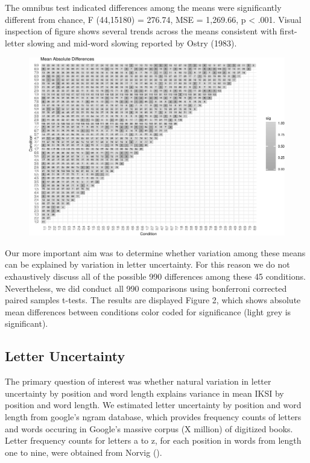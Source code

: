 \documentclass[floatsintext,man]{apa6}
\theoremstyle{definition}
\theoremstyle{definition}
\theoremstyle{definition}
\theoremstyle{remark}
\begin{document}
The omnibus test indicated differences among the means were
significantly different from chance, F (44,15180) = 276.74, MSE =
1,269.66, p \textless{} .001. Visual inspection of figure shows several
trends across the means consistent with first-letter slowing and
mid-word slowing reported by Ostry (1983).

\begin{figure}[htbp]
\centering
\includegraphics{Entropy_typing_draft_files/figure-latex/typing_mean_iksis_comparisons-1.pdf}
\caption{}
\end{figure}

Our more important aim was to determine whether variation among these
means can be explained by variation in letter uncertainty. For this
reason we do not exhaustively discuss all of the possible 990
differences among these 45 conditions. Nevertheless, we did conduct all
990 comparisons using bonferroni corrected paired samples t-tests. The
results are displayed Figure 2, which shows absolute mean differences
between conditions color coded for significance (light grey is
significant).

\subsection{Letter Uncertainty}\label{letter-uncertainty}

The primary question of interest was whether natural variation in letter
uncertainty by position and word length explains variance in mean IKSI
by position and word length. We estimated letter uncertainty by position
and word length from google's ngram database, which provides frequency
counts of letters and words occuring in Google's massive corpus (X
million) of digitized books. Letter frequency counts for letters a to z,
for each position in words from length one to nine, were obtained from
Norvig ().
\end{document}
